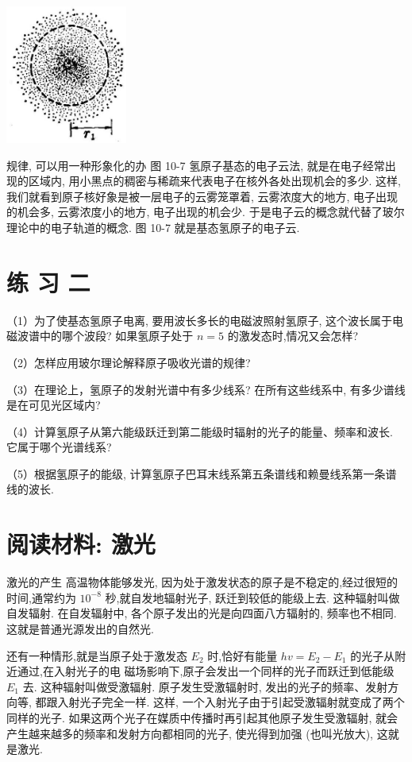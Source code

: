 \documentclass[10pt]{article}
\begin{document}
\begin{center}
\includegraphics[max width=0.3\textwidth]{images/01913056-1f15-74d8-9184-9aab52c9d66b_337_912201.jpg}
\end{center}

规律, 可以用一种形象化的办 图 10-7 氢原子基态的电子云法, 就是在电子经常出现的区域内, 用小黑点的稠密与稀疏来代表电子在核外各处出现机会的多少. 这样, 我们就看到原子核好象是被一层电子的云雾笼罩着, 云雾浓度大的地方, 电子出现的机会多, 云雾浓度小的地方, 电子出现的机会少. 于是电子云的概念就代替了玻尔理论中的电子轨道的概念. 图 10-7 就是基态氢原子的电子云.

\section*{练 习 二}

（1）为了使基态氢原子电离, 要用波长多长的电磁波照射氢原子, 这个波长属于电磁波谱中的哪个波段? 如果氢原子处于 \(n = 5\) 的激发态时,情况又会怎样?

（2）怎样应用玻尔理论解释原子吸收光谱的规律?

（3）在理论上，氢原子的发射光谱中有多少线系? 在所有这些线系中, 有多少谱线是在可见光区域内?

（4）计算氢原子从第六能级跃迁到第二能级时辐射的光子的能量、频率和波长. 它属于哪个光谱线系?

（5）根据氢原子的能级, 计算氢原子巴耳末线系第五条谱线和赖曼线系第一条谱线的波长.

\section*{阅读材料: 激光}

激光的产生 高温物体能够发光, 因为处于激发状态的原子是不稳定的,经过很短的时间,通常约为 \({10}^{-8}\) 秒,就自发地辐射光子, 跃迁到较低的能级上去. 这种辐射叫做自发辐射. 在自发辐射中, 各个原子发出的光是向四面八方辐射的, 频率也不相同. 这就是普通光源发出的自然光.

还有一种情形,就是当原子处于激发态 \({E}_{2}\) 时,恰好有能量 \({hv} = {E}_{2} - {E}_{1}\) 的光子从附近通过,在入射光子的电 磁场影响下,原子会发出一个同样的光子而跃迁到低能级 \({E}_{1}\) 去. 这种辐射叫做受激辐射. 原子发生受激辐射时, 发出的光子的频率、发射方向等, 都跟入射光子完全一样. 这样, 一个入射光子由于引起受激辐射就变成了两个同样的光子. 如果这两个光子在媒质中传播时再引起其他原子发生受激辐射, 就会产生越来越多的频率和发射方向都相同的光子, 使光得到加强 (也叫光放大), 这就是激光.
\end{document}
